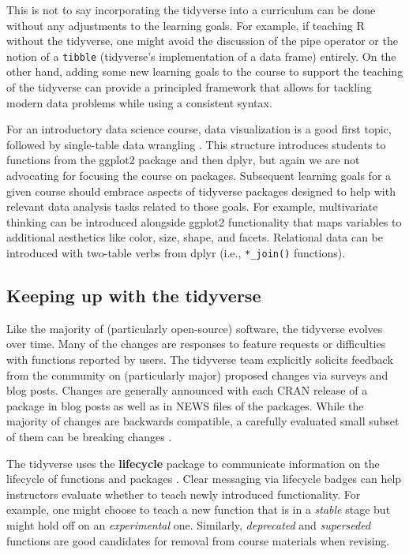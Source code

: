 \documentclass[12pt]{article}
\begin{document}
This is not to say incorporating the tidyverse into a curriculum can be
done without any adjustments to the learning goals. For example, if
teaching R without the tidyverse, one might avoid the discussion of the
pipe operator or the notion of a \texttt{tibble} (tidyverse's
implementation of a data frame) entirely. On the other hand, adding some
new learning goals to the course to support the teaching of the
tidyverse can provide a principled framework that allows for tackling
modern data problems while using a consistent syntax.

For an introductory data science course, data visualization is a good
first topic, followed by single-table data wrangling
\citep{cetinkaya2020fresh}. This structure introduces students to
functions from the ggplot2 package and then dplyr, but again we are not
advocating for focusing the course on packages. Subsequent learning
goals for a given course should embrace aspects of tidyverse packages
designed to help with relevant data analysis tasks related to those
goals. For example, multivariate thinking can be introduced alongside
ggplot2 functionality that maps variables to additional aesthetics like
color, size, shape, and facets. Relational data can be introduced with
two-table verbs from dplyr (i.e., \texttt{*\_join()} functions).

\hypertarget{keeping-up-with-the-tidyverse}{%
\subsection{Keeping up with the
tidyverse}\label{keeping-up-with-the-tidyverse}}

Like the majority of (particularly open-source) software, the tidyverse
evolves over time. Many of the changes are responses to feature requests
or difficulties with functions reported by users. The tidyverse team
explicitly solicits feedback from the community on (particularly major)
proposed changes via surveys and blog posts. Changes are generally
announced with each CRAN release of a package in blog posts as well as
in NEWS files of the packages. While the majority of changes are
backwards compatible, a carefully evaluated small subset of them can be
breaking changes \citep{WickhamMaintaining2021}.

The tidyverse uses the \textbf{lifecycle} package to communicate
information on the lifecycle of functions and packages
\citep{R-lifecycle}. Clear messaging via lifecycle badges can help
instructors evaluate whether to teach newly introduced functionality.
For example, one might choose to teach a new function that is in a
\emph{stable} stage but might hold off on an \emph{experimental} one.
Similarly, \emph{deprecated} and \emph{superseded} functions are good
candidates for removal from course materials when revising.
\end{document}
